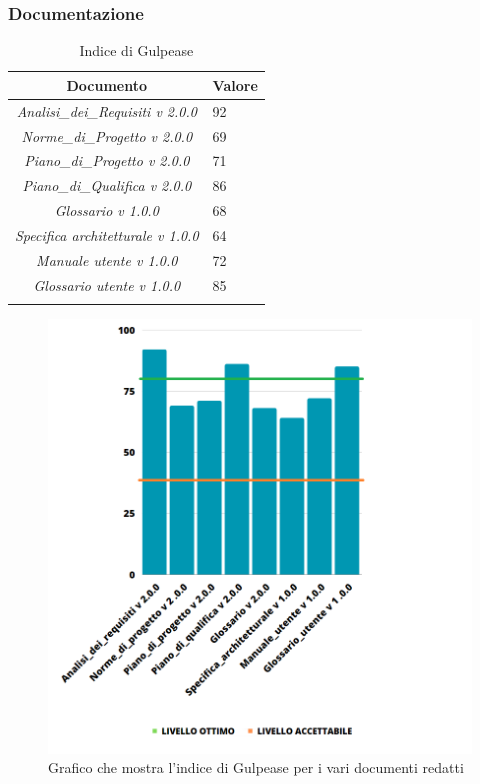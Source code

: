 \subsubsection{Documentazione}
\begin{table}[H]
	\centering
	\setlength\extrarowheight{5pt}
	\renewcommand\tabularxcolumn[1]{>{\Centering}m{#1}}
	\begin{tabularx}{\textwidth}{| c | X |} 
		\hline
		\rowcolor{white}
		\textbf{Documento} & \textbf{Valore}\\
		\hline
		\textit{Analisi\_dei\_Requisiti v 2.0.0} & 92 \\
		\hline
		\textit{Norme\_di\_Progetto v 2.0.0} & 69\\
		\hline
		\textit{Piano\_di\_Progetto v 2.0.0} & 71\\
		\hline
		\textit{Piano\_di\_Qualifica v 2.0.0} & 86\\
		\hline
		\textit{Glossario v 1.0.0} & 68\\
        \hline
		\textit{Specifica architetturale v 1.0.0} & 64\\
        \hline
		\textit{Manuale utente v 1.0.0} & 72\\
         \hline
		\textit{Glossario utente v 1.0.0} & 85\\
		\hline
		\rowcolor{white}
		\caption{Indice di Gulpease}
	\end{tabularx}
\end{table}
\begin{figure}[H]
	\centering
	\includegraphics[scale=1.1]{img/Gulpease2.png}
	\caption{Grafico che mostra l'indice di Gulpease per i vari documenti redatti}
\end{figure}
